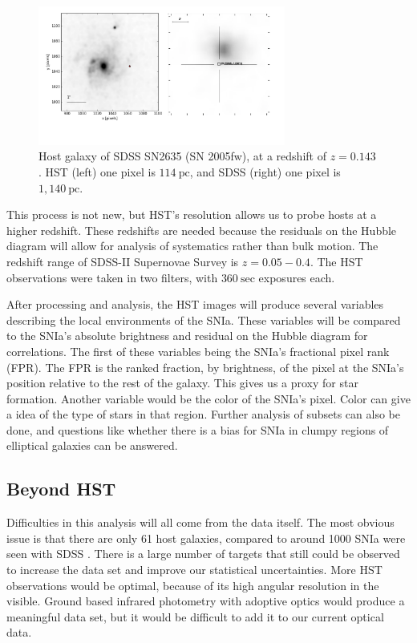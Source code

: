 \documentclass[apj, iop]{emulateapj}
\newcommand{\sn}{SNIa}
\begin{document}
\begin{figure}
	\includegraphics[width=3.2in]{SN2635-combined-inverted.pdf}
	\caption{Host galaxy of SDSS SN2635 (SN 2005fw), at a redshift of $z=0.143$. HST 
	(left) one pixel is $114~\text{pc}$, and SDSS (right) one pixel is $1,140~\text{pc}$.}
	\label{f:galaxy-compare}
\end{figure}

This process is not new, but HST's resolution allows us to probe hosts at a
higher redshift. These redshifts are needed because the residuals on the Hubble
diagram will allow for analysis of systematics rather than bulk motion. The
redshift range of SDSS-II Supernovae Survey is $z=0.05-0.4$. The HST
observations were taken in two filters, with $360~\text{sec}$ exposures each.

After processing and analysis, the HST images will produce several variables
describing the local environments of the \sn{}. These variables will be compared
to the \sn{}'s absolute brightness and residual on the Hubble diagram for
correlations. The first of these variables being the \sn{}'s fractional pixel
rank (FPR). The FPR is the ranked fraction, by brightness, of the pixel at the
\sn{}'s position relative to the rest of the galaxy. This gives us a proxy for
star formation. Another variable would be the color of the \sn{}'s pixel. Color
can give a idea of the type of stars in that region. Further analysis of subsets
can also be done, and questions like whether there is a bias for \sn{} in clumpy
regions of elliptical galaxies can be answered.


\subsection{Beyond HST}\label{beyond-hst}

Difficulties in this analysis will all come from the data itself. The most
obvious issue is that there are only 61 host galaxies, compared to around 1000
\sn{} were seen with SDSS \citep{Campbell13}. There is a large number of targets
that still could be observed to increase the data set and improve our
statistical uncertainties. More HST observations would be optimal, because of
its high angular resolution in the visible. Ground based infrared photometry
with adoptive optics would produce a meaningful data set, but it would be
difficult to add it to our current optical data.
\end{document}
